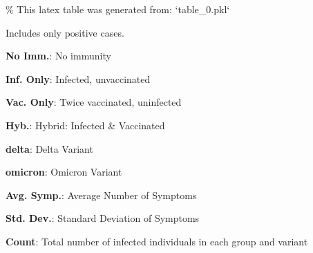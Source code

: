 \documentclass[11pt]{article}
\begin{document}
\begin{codeoutput}
\% This latex table was generated from: `table\_0.pkl`
\begin{table}[h]
\caption{Avg. symptom no. by immunity group \& variant}
\label{table:dist\_symp}
\begin{threeparttable}
\renewcommand{\TPTminimum}{\linewidth}
\begin{tablenotes}
\footnotesize
\item Includes only positive cases.
\item \textbf{No Imm.}: No immunity
\item \textbf{Inf. Only}: Infected, unvaccinated
\item \textbf{Vac. Only}: Twice vaccinated, uninfected
\item \textbf{Hyb.}: Hybrid: Infected \& Vaccinated
\item \textbf{delta}: Delta Variant
\item \textbf{omicron}: Omicron Variant
\item \textbf{Avg. Symp.}: Average Number of Symptoms
\item \textbf{Std. Dev.}: Standard Deviation of Symptoms
\item \textbf{Count}: Total number of infected individuals in each group and variant
\end{tablenotes}
\end{threeparttable}
\end{table}
\end{codeoutput}
\end{document}
